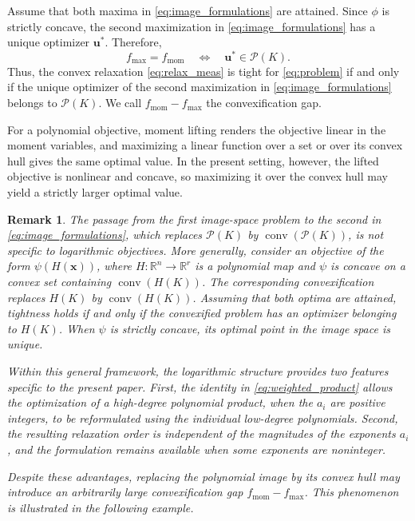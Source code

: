 \documentclass[pdflatex,sn-mathphys-num]{sn-jnl}%
\newcommand{\vect}[1]{\boldsymbol{#1}}
\theoremstyle{thmstyleone}%
\theoremstyle{thmstyletwo}%
\newtheorem{remark}{Remark}%
\theoremstyle{thmstylethree}%
\begin{document}
Assume that both maxima in \eqref{eq:image_formulations} are attained.
Since $\phi$ is strictly concave, the second maximization in
\eqref{eq:image_formulations} has a unique optimizer $\vect{u}^*$. Therefore,
\[
f_{\max}=f_{\operatorname{mom}}
\quad\Longleftrightarrow\quad
\vect{u}^*\in\mathcal{P}(K).
\]
Thus, the convex relaxation \eqref{eq:relax_meas} is tight for
\eqref{eq:problem} if and only if the unique optimizer of
the second maximization in \eqref{eq:image_formulations}
belongs to $\mathcal{P}(K)$. We call
$f_{\operatorname{mom}}-f_{\max}$ the convexification gap.


For a polynomial objective, moment lifting renders the objective
linear in the moment variables, and maximizing a linear function over
a set or over its convex hull gives the same optimal value. In the
present setting, however, the lifted objective is nonlinear and
concave, so maximizing it over the convex hull may yield a strictly
larger optimal value.

{\color{red}
\begin{remark}
The passage from the first image-space problem to the second in
\eqref{eq:image_formulations}, which replaces $\mathcal{P}(K)$ by
$\operatorname{conv}(\mathcal{P}(K))$, is not specific to logarithmic
objectives. More generally, consider an objective of the form $\psi(H(\vect{x}))$, where $H:\mathbb{R}^n\to\mathbb{R}^r$ is a polynomial map and $\psi$ is concave on a convex set containing $\operatorname{conv}(H(K))$.
The corresponding convexification replaces $H(K)$ by $\operatorname{conv}(H(K))$.
Assuming that both optima are attained, tightness holds if and only if the convexified problem has an optimizer belonging to $H(K)$.
When $\psi$ is strictly concave, its optimal point in the image space is unique.

Within this general framework, the logarithmic structure provides two
features specific to the present paper. First, the identity in
\eqref{eq:weighted_product} allows the optimization of a high-degree
polynomial product, when the $a_i$ are positive integers, to be
reformulated using the individual low-degree polynomials.
Second, the resulting relaxation order is independent of the magnitudes of the exponents $a_i$, and the formulation remains available when some exponents are noninteger.

Despite these advantages, replacing the polynomial image by its convex
hull may introduce an arbitrarily large convexification gap
$f_{\operatorname{mom}}-f_{\max}$. This phenomenon is illustrated in
the following example.
\end{remark}
}
\end{document}
